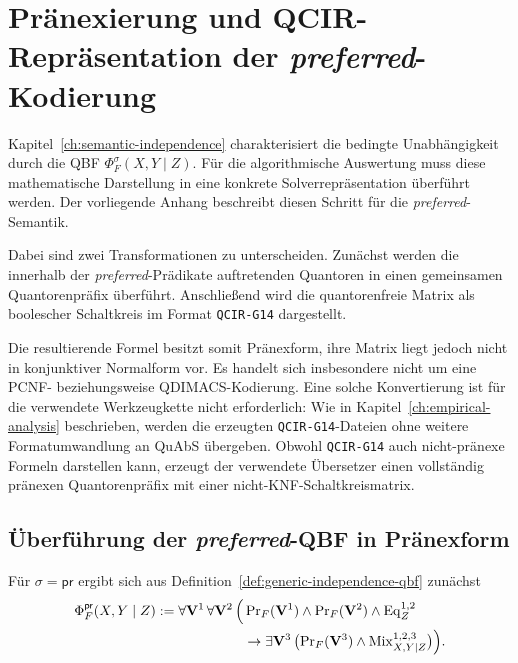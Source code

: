 \chapter{Pränexierung und QCIR-Repräsentation der
\emph{preferred}-Kodierung}
\label{ch:preferred-prenex-qcir}

Kapitel~\ref{ch:semantic-independence} charakterisiert die bedingte
Unabhängigkeit durch die QBF
\(\Phi_F^\sigma(X,Y\mid Z)\). Für die algorithmische Auswertung muss
diese mathematische Darstellung in eine konkrete Solverrepräsentation
überführt werden. Der vorliegende Anhang beschreibt diesen Schritt für
die \emph{preferred}-Semantik.

Dabei sind zwei Transformationen zu unterscheiden. Zunächst werden die
innerhalb der \emph{preferred}-Prädikate auftretenden Quantoren in einen
gemeinsamen Quantorenpräfix überführt. Anschließend wird die
quantorenfreie Matrix als boolescher Schaltkreis im Format
\texttt{QCIR-G14} dargestellt.

Die resultierende Formel besitzt somit Pränexform, ihre Matrix liegt
jedoch nicht in konjunktiver Normalform vor. Es handelt sich insbesondere
nicht um eine PCNF- beziehungsweise QDIMACS-Kodierung. Eine solche
Konvertierung ist für die verwendete Werkzeugkette nicht erforderlich:
Wie in Kapitel~\ref{ch:empirical-analysis} beschrieben, werden die
erzeugten \texttt{QCIR-G14}-Dateien ohne weitere Formatumwandlung an
QuAbS übergeben. Obwohl \texttt{QCIR-G14} auch nicht-pränexe Formeln
darstellen kann, erzeugt der verwendete Übersetzer einen vollständig
pränexen Quantorenpräfix mit einer nicht-KNF-Schaltkreismatrix.

\section{Überführung der \emph{preferred}-QBF in Pränexform}
\label{sec:preferred-prenex}

Für \(\sigma=\mathsf{pr}\) ergibt sich aus
Definition~\ref{def:generic-independence-qbf} zunächst
\[
\begin{split}
\Phi_F^{\mathsf{pr}}(X,Y\mid Z)
:=
\forall\mathbf V^1\,\forall\mathbf V^2\,
\Bigl(&
    \operatorname{Pr}_F(\mathbf V^1)
    \land
    \operatorname{Pr}_F(\mathbf V^2)
    \land
    \operatorname{Eq}^{1,2}_Z
\\
&\rightarrow
    \exists\mathbf V^3\,
    \bigl(
        \operatorname{Pr}_F(\mathbf V^3)
        \land
        \operatorname{Mix}^{1,2,3}_{X,Y\mid Z}
    \bigr)
\Bigr).
\end{split}
\]

